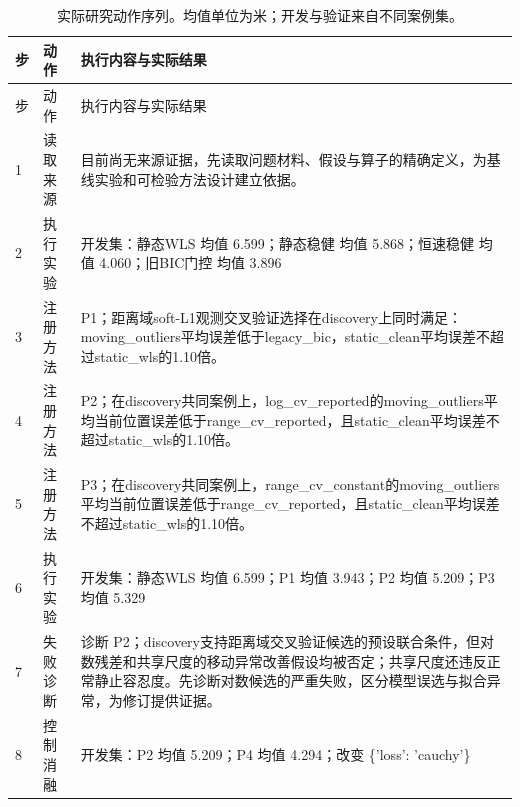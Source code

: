 \begin{longtable}{@{}p{8mm}p{23mm}p{121mm}@{}}

\caption{实际研究动作序列。均值单位为米；开发与验证来自不同案例集。}\label{tab:trace}\\

\toprule 步 & 动作 & 执行内容与实际结果\\\midrule\endfirsthead

\toprule 步 & 动作 & 执行内容与实际结果\\\midrule\endhead

\bottomrule\endfoot

1 & 读取来源 & 目前尚无来源证据，先读取问题材料、假设与算子的精确定义，为基线实验和可检验方法设计建立依据。\\[3pt]

2 & 执行实验 & 开发集：静态WLS 均值 6.599；静态稳健 均值 5.868；恒速稳健 均值 4.060；旧BIC门控 均值 3.896\\[3pt]

3 & 注册方法 & P1；距离域soft-L1观测交叉验证选择在discovery上同时满足：moving\_\allowbreak{}outliers平均误差低于legacy\_\allowbreak{}bic，static\_\allowbreak{}clean平均误差不超过static\_\allowbreak{}wls的1.10倍。\\[3pt]

4 & 注册方法 & P2；在discovery共同案例上，log\_\allowbreak{}cv\_\allowbreak{}reported的moving\_\allowbreak{}outliers平均当前位置误差低于range\_\allowbreak{}cv\_\allowbreak{}reported，且static\_\allowbreak{}clean平均误差不超过static\_\allowbreak{}wls的1.10倍。\\[3pt]

5 & 注册方法 & P3；在discovery共同案例上，range\_\allowbreak{}cv\_\allowbreak{}constant的moving\_\allowbreak{}outliers平均当前位置误差低于range\_\allowbreak{}cv\_\allowbreak{}reported，且static\_\allowbreak{}clean平均误差不超过static\_\allowbreak{}wls的1.10倍。\\[3pt]

6 & 执行实验 & 开发集：静态WLS 均值 6.599；P1 均值 3.943；P2 均值 5.209；P3 均值 5.329\\[3pt]

7 & 失败诊断 & 诊断 P2；discovery支持距离域交叉验证候选的预设联合条件，但对数残差和共享尺度的移动异常改善假设均被否定；共享尺度还违反正常静止容忍度。先诊断对数候选的严重失败，区分模型误选与拟合异常，为修订提供证据。\\[3pt]

8 & 控制消融 & 开发集：P2 均值 5.209；P4 均值 4.294；改变 \{'loss': 'cauchy'\}\\[3pt]


\end{longtable}

